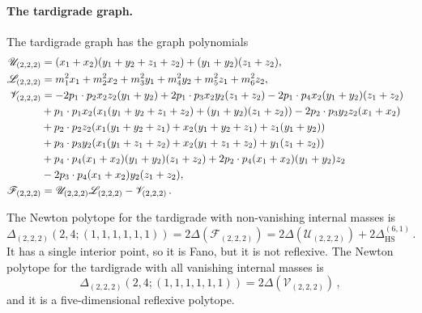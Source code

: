 \documentclass[12pt,a4paper]{article}
\theoremstyle{plain}
\theoremstyle{remark}
\newcommand{\cU}{\mathscr {U}}
\newcommand{\cF}{\mathscr {F}}
\newcommand{\cV}{\mathscr {V}}
\newcommand{\cL}{\mathscr {L}}
\newcommand{\Newton}{\Delta}
\newcommand{\simplexwithpars}[1]{\Newton_{\text{HS}}^{(#1)}}
\begin{document}
        \paragraph{The tardigrade graph.}
		The tardigrade graph has the graph polynomials
		\begin{align}\label{e:tardigradePolynomials}
			\cU_{(2,2,2)}&=(x_{1}+x_2) (y_{1}+y_{2}+z_1+z_2)+(y_{1}+y_{2})(z_1+z_2),\cr
			\cL_{(2,2,2)}&=m_1^2x_1+m_2^2x_2+m_3^2y_1+m_4^2y_2+m_5^2z_1+m_6^2z_2,\cr
			\cV_{(2,2,2)}&=-2 p_{1} \cdot p_{2} x_{2} z_{2}  (y_{1}+y_{2})+2p_{1} \cdot p_{3} x_{2} y_{2}
			 (z_{1}+z_{2})-2  p_{1} \cdot p_{4}x_{2}
			(y_{1}+y_{2}) (z_{1}+z_{2})\cr
			&+p_{1} \cdot p_{1} x_{2} (x_{1}
			(y_{1}+y_{2}+z_{1}+z_{2})+(y_{1}+y_{2})
			(z_{1}+z_{2}))-2 p_{2} \cdot p_{3} y_{2} z_{2}
                   (x_{1}+x_{2})\cr
                  	&+p_{2} \cdot p_{2} z_{2} (x_{1}
			(y_{1}+y_{2}+z_{1})+x_{2} (y_{1}+y_{2}+z_{1})+z_{1}
                     (y_{1}+y_{2}))\cr                
                       &+p_{3} \cdot p_{3} y_{2} (x_{1}
			(y_{1}+z_{1}+z_{2})+x_{2} (y_{1}+z_{1}+z_{2})+y_{1}
                         (z_{1}+z_{2}))\cr                         
                       &+p_{4} \cdot p_{4} (x_{1}+x_{2}) (y_{1}+y_{2})
                         (z_{1}+z_{2})+2  p_{2} \cdot p_{4} (x_{1}+x_{2})
                            (y_{1}+y_{2})z_{2}\cr
                          &
                            -2  p_{3} \cdot p_{4} (x_{1}+x_{2})y_{2}
			(z_{1}+z_{2}),                       \cr
			\cF_{(2,2,2)}&=\cU_{(2,2,2)}\cL_{(2,2,2)}-\cV_{(2,2,2)}\,.
		\end{align}
		
		The Newton polytope for the tardigrade with
                non-vanishing internal masses is 
                \begin{equation}
                  \Delta_{(2,2,2)}(2,4;(1,1,1,1,1,1))=2\Newton(\cF_{(2,2,2)})=2\Newton(\cU_{(2,2,2)})+2\simplexwithpars{6,1} \, .                  
                \end{equation}
                It has a single interior point, so it is Fano, but it is not reflexive.
                The Newton polytope for the tardigrade with
                all vanishing internal masses is
                \begin{equation}
                  \Delta_{(2,2,2)}(2,4;(1,1,1,1,1,1))=2\Newton(\cV_{(2,2,2)}) \, ,                                 \end{equation}
and it is a five-dimensional reflexive polytope.
		
	
		
\end{document}
